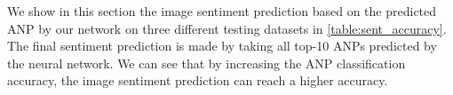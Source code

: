 We show in this section the image sentiment prediction based on the predicted ANP by our network on three different testing datasets in \ref{table:sent_accuracy}. The final sentiment prediction is made by taking all top-10 ANPs predicted by the neural network. We can see that by increasing the ANP classification accuracy, the image sentiment prediction can reach a higher accuracy. 
